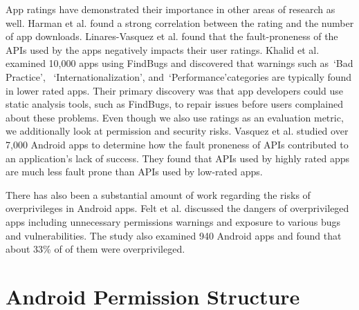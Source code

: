 \documentclass{sig-alternate}
\newcommand{\dan}[1]{\textcolor{blue}{{\it [Dan says: #1]}}}
\begin{document}

App ratings have demonstrated their importance in other areas of research as well. Harman et al.\cite{6224306} found a strong correlation between the rating and the number of app downloads. Linares-Vasquez et al.\cite{Linares-Vasquez:2013:ACF:2491411.2491428} found that the fault-proneness of the APIs used by the apps negatively impacts their user ratings. Khalid et al.\cite{Khalid_Mei_Examinging} examined 10,000 apps using FindBugs and discovered that warnings such as~\lq Bad Practice\rq, ~\lq Internationalization\rq, and~\lq Performance\rq categories are typically found in lower rated apps. Their primary discovery was that app developers could use static analysis tools, such as FindBugs, to repair issues before users complained about these problems. Even though we also use ratings as an evaluation metric, we additionally look at permission and security risks. Vasquez et al.\cite{linares2013api} studied over 7,000 Android apps to determine how the fault proneness of APIs contributed to an application's lack of success. They found that APIs used by highly rated apps are much less fault prone than APIs used by low-rated apps.

There has also been a substantial amount of work regarding the risks of overprivileges in Android apps. Felt et al.\cite{Felt:2011:APD:2046707.2046779} discussed the dangers of overprivileged apps including unnecessary permissions warnings and exposure to various bugs and vulnerabilities. The study also examined 940 Android apps and found that about 33\% of of them were overprivileged. %



\section{Android Permission Structure}
\label{sec:structure}
\end{document}

